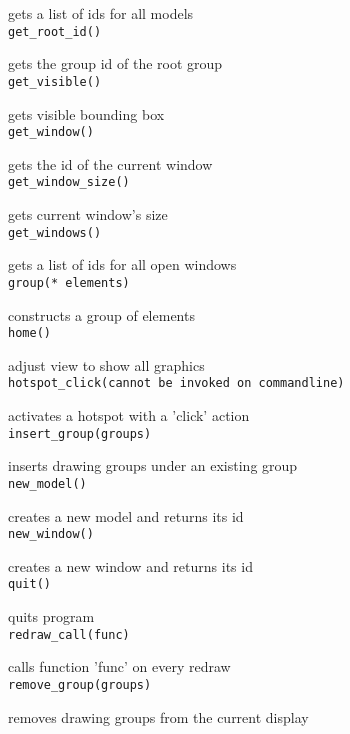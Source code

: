gets a list of ids for all models \\


{\tt get\_root\_id() }

gets the group id of the root group \\


{\tt get\_visible() }

gets visible bounding box \\


{\tt get\_window() }

gets the id of the current window \\


{\tt get\_window\_size() }

gets current window's size \\


{\tt get\_windows() }

gets a list of ids for all open windows \\


{\tt group(* elements) }

constructs a group of elements \\


{\tt home() }

adjust view to show all graphics \\


{\tt hotspot\_click(cannot be invoked on commandline) }

activates a hotspot with a 'click' action \\


{\tt insert\_group(groups) }

inserts drawing groups under an existing group \\


{\tt new\_model() }

creates a new model and returns its id \\


{\tt new\_window() }

creates a new window and returns its id \\


{\tt quit() }

quits program \\


{\tt redraw\_call(func) }

calls function 'func' on every redraw \\


{\tt remove\_group(groups) }

removes drawing groups from the current display \\


